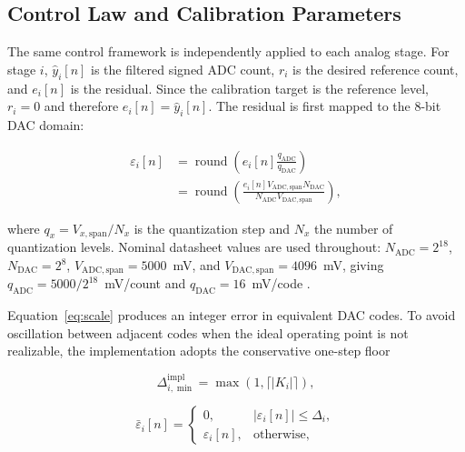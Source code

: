 \subsection{Control Law and Calibration Parameters}

The same control framework is independently applied to each analog stage. For stage $i$, $\hat{y}_i[n]$ is the filtered signed ADC count, $r_i$ is the desired reference count, and $e_i[n]$ is the residual. Since the calibration target is the reference level, $r_i=0$ and therefore $e_i[n]=\hat{y}_i[n]$. The residual is first mapped to the 8-bit DAC domain:

\begin{equation}
 \begin{aligned}
 \varepsilon_i[n]
 &= \operatorname{round}\!\left(e_i[n]\frac{q_{\mathrm{ADC}}}{q_{\mathrm{DAC}}}\right)\\
 &= \operatorname{round}\!\left(
 \frac{e_i[n]V_{\mathrm{ADC,span}}N_{\mathrm{DAC}}}
 {N_{\mathrm{ADC}}V_{\mathrm{DAC,span}}}\right),
 \end{aligned}
 \label{eq:scale}
\end{equation}

where $q_x=V_{x,\mathrm{span}}/N_x$ is the quantization step and $N_x$ the number of quantization levels. Nominal datasheet values are used throughout: $N_{\mathrm{ADC}}=2^{18}$, $N_{\mathrm{DAC}}=2^8$, $V_{\mathrm{ADC,span}}=5000$~mV, and $V_{\mathrm{DAC,span}}=4096$~mV, giving $q_{\mathrm{ADC}}=5000/2^{18}$~mV/count and $q_{\mathrm{DAC}}=16$~mV/code \cite{InfineonPSoC,InfineonAN60305}.

Equation~\ref{eq:scale} produces an integer error in equivalent DAC codes. To avoid oscillation between adjacent codes when the ideal operating point is not realizable, the implementation adopts the conservative one-step floor

\par\noindent
\begin{minipage}[c]{0.45\columnwidth}
\footnotesize
\begin{equation}
 \Delta_{i,\min}^{\mathrm{impl}}=\max(1,\lceil|K_i|\rceil),
 \label{eq:deadband}
\end{equation}
\end{minipage}%
\hfill
\begin{minipage}[c]{0.54\columnwidth}
\footnotesize
\begin{equation}
 \bar{\varepsilon}_i[n]=
 \begin{cases}
 0, & |\varepsilon_i[n]|\leq\Delta_i,\\
 \varepsilon_i[n], & \text{otherwise},
 \end{cases}
 \label{eq:deadband-error}
\end{equation}
\end{minipage}
\par


